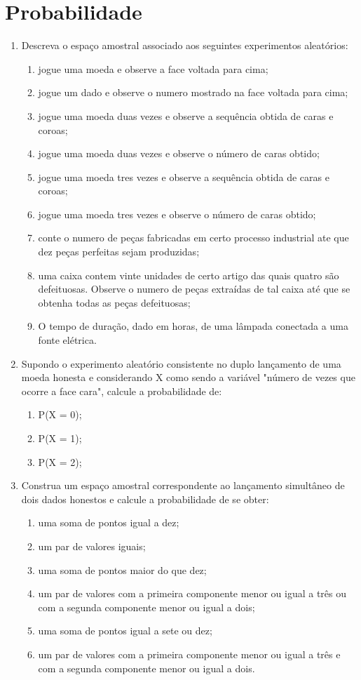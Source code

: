\chapter{Probabilidade}

\begin{enumerate}[resume]

\item Descreva o espaço amostral associado aos seguintes experimentos aleatórios:
	\begin{enumerate}
	\item jogue uma moeda e observe a face voltada para cima;
	\item jogue um dado e observe o numero mostrado na face voltada para cima;
	\item jogue uma moeda duas vezes e observe a sequência obtida de caras e coroas;
	\item jogue uma moeda duas vezes e observe o número de caras obtido;
	\item jogue uma moeda tres vezes e observe a sequência obtida de caras e coroas;
	\item jogue uma moeda tres vezes e observe o número de caras obtido;
	\item conte o numero de peças fabricadas em certo processo industrial ate que dez peças perfeitas sejam produzidas;
	\item uma caixa contem vinte unidades de certo artigo das quais quatro são defeituosas. Observe o numero de peças extraídas de tal caixa até que se obtenha todas as peças defeituosas;
	\item O tempo de duração, dado em horas, de uma lâmpada conectada a uma fonte elétrica.
	\end{enumerate}
	
\item Supondo o experimento aleatório consistente no duplo lançamento de uma moeda honesta e considerando X como sendo a variável "número de vezes que ocorre a face cara", calcule a probabilidade de:
	\begin{enumerate}
	\item P(X = 0);
	\item P(X = 1);
	\item P(X = 2);
	\end{enumerate}
	
\item Construa um espaço amostral correspondente ao lançamento simultâneo de dois dados honestos e calcule a probabilidade de se obter:
	\begin{enumerate}
	\item uma soma de pontos igual a dez;
	\item um par de valores iguais;
	\item uma soma de pontos maior do que dez;
	\item um par de valores com a primeira componente menor ou igual a três ou com a segunda componente menor ou igual a dois;
	\item uma soma de pontos igual a sete ou dez;
	\item um par de valores com a primeira componente menor ou igual a três e com a segunda componente menor ou igual a dois.
	\end{enumerate}		


\end{enumerate}
